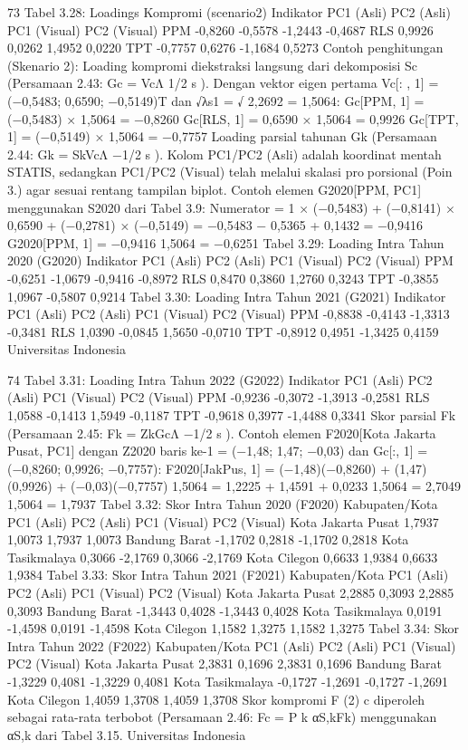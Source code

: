 73
Tabel 3.28: Loadings Kompromi (scenario2)
Indikator PC1 (Asli) PC2 (Asli) PC1 (Visual) PC2 (Visual)
PPM -0,8260 -0,5578 -1,2443 -0,4687
RLS 0,9926 0,0262 1,4952 0,0220
TPT -0,7757 0,6276 -1,1684 0,5273
Contoh penghitungan (Skenario 2): Loading kompromi diekstraksi langsung dari
dekomposisi Sc (Persamaan 2.43: Gc = VcΛ
1/2
s ). Dengan vektor eigen pertama Vc[:
, 1] = (−0,5483; 0,6590; −0,5149)T dan √λs1 =
√
2,2692 = 1,5064:
Gc[PPM, 1] = (−0,5483) × 1,5064 = −0,8260
Gc[RLS, 1] = 0,6590 × 1,5064 = 0,9926
Gc[TPT, 1] = (−0,5149) × 1,5064 = −0,7757
Loading parsial tahunan Gk (Persamaan 2.44: Gk = SkVcΛ
−1/2
s ). Kolom PC1/PC2 (Asli)
adalah koordinat mentah STATIS, sedangkan PC1/PC2 (Visual) telah melalui skalasi proporsional (Poin 3.) agar sesuai rentang tampilan biplot. Contoh elemen G2020[PPM, PC1]
menggunakan S2020 dari Tabel 3.9:
Numerator = 1 × (−0,5483) + (−0,8141) × 0,6590 + (−0,2781) × (−0,5149)
= −0,5483 − 0,5365 + 0,1432 = −0,9416
G2020[PPM, 1] = −0,9416
1,5064
= −0,6251
Tabel 3.29: Loading Intra Tahun 2020 (G2020)
Indikator PC1 (Asli) PC2 (Asli) PC1 (Visual) PC2 (Visual)
PPM -0,6251 -1,0679 -0,9416 -0,8972
RLS 0,8470 0,3860 1,2760 0,3243
TPT -0,3855 1,0967 -0,5807 0,9214
Tabel 3.30: Loading Intra Tahun 2021 (G2021)
Indikator PC1 (Asli) PC2 (Asli) PC1 (Visual) PC2 (Visual)
PPM -0,8838 -0,4143 -1,3313 -0,3481
RLS 1,0390 -0,0845 1,5650 -0,0710
TPT -0,8912 0,4951 -1,3425 0,4159
Universitas Indonesia

74
Tabel 3.31: Loading Intra Tahun 2022 (G2022)
Indikator PC1 (Asli) PC2 (Asli) PC1 (Visual) PC2 (Visual)
PPM -0,9236 -0,3072 -1,3913 -0,2581
RLS 1,0588 -0,1413 1,5949 -0,1187
TPT -0,9618 0,3977 -1,4488 0,3341
Skor parsial Fk (Persamaan 2.45: Fk = ZkGcΛ
−1/2
s ). Contoh elemen
F2020[Kota Jakarta Pusat, PC1] dengan Z2020 baris ke-1 = (−1,48; 1,47; −0,03) dan
Gc[:, 1] = (−0,8260; 0,9926; −0,7757):
F2020[JakPus, 1] = (−1,48)(−0,8260) + (1,47)(0,9926) + (−0,03)(−0,7757)
1,5064
=
1,2225 + 1,4591 + 0,0233
1,5064
=
2,7049
1,5064
= 1,7937
Tabel 3.32: Skor Intra Tahun 2020 (F2020)
Kabupaten/Kota PC1 (Asli) PC2 (Asli) PC1 (Visual) PC2 (Visual)
Kota Jakarta Pusat 1,7937 1,0073 1,7937 1,0073
Bandung Barat -1,1702 0,2818 -1,1702 0,2818
Kota Tasikmalaya 0,3066 -2,1769 0,3066 -2,1769
Kota Cilegon 0,6633 1,9384 0,6633 1,9384
Tabel 3.33: Skor Intra Tahun 2021 (F2021)
Kabupaten/Kota PC1 (Asli) PC2 (Asli) PC1 (Visual) PC2 (Visual)
Kota Jakarta Pusat 2,2885 0,3093 2,2885 0,3093
Bandung Barat -1,3443 0,4028 -1,3443 0,4028
Kota Tasikmalaya 0,0191 -1,4598 0,0191 -1,4598
Kota Cilegon 1,1582 1,3275 1,1582 1,3275
Tabel 3.34: Skor Intra Tahun 2022 (F2022)
Kabupaten/Kota PC1 (Asli) PC2 (Asli) PC1 (Visual) PC2 (Visual)
Kota Jakarta Pusat 2,3831 0,1696 2,3831 0,1696
Bandung Barat -1,3229 0,4081 -1,3229 0,4081
Kota Tasikmalaya -0,1727 -1,2691 -0,1727 -1,2691
Kota Cilegon 1,4059 1,3708 1,4059 1,3708
Skor kompromi F
(2)
c diperoleh sebagai rata-rata terbobot (Persamaan 2.46: Fc =
P
k αS,kFk) menggunakan αS,k dari Tabel 3.15.
Universitas Indonesia

